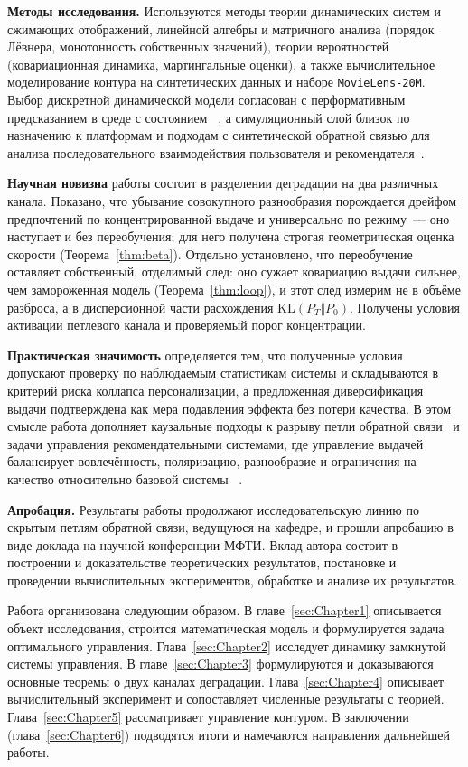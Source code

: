 \textbf{Методы исследования.} Используются методы теории динамических систем и
сжимающих отображений, линейной алгебры и матричного анализа (порядок Лёвнера,
монотонность собственных значений), теории вероятностей (ковариационная
динамика, мартингальные оценки), а также вычислительное моделирование контура на
синтетических данных и наборе \texttt{MovieLens-20M}. Выбор дискретной
динамической модели согласован с перформативным предсказанием в среде с состоянием
~\cite{brown2022stateful}, а симуляционный слой близок по назначению к
платформам и подходам с синтетической обратной связью для анализа последовательного
взаимодействия пользователя и рекомендателя~\cite{ie2019,
wang2021generativeFeedback}.

\textbf{Научная новизна} работы состоит в разделении деградации на два различных
канала. Показано, что убывание совокупного разнообразия порождается дрейфом
предпочтений по концентрированной выдаче и универсально по режиму~--- оно
наступает и без переобучения; для него получена строгая геометрическая оценка
скорости (Теорема~\ref{thm:beta}). Отдельно установлено, что переобучение
оставляет собственный, отделимый след: оно сужает ковариацию выдачи сильнее, чем
замороженная модель (Теорема~\ref{thm:loop}), и этот след измерим не в объёме
разброса, а в дисперсионной части расхождения $\mathrm{KL}(P_T\Vert P_0)$.
Получены условия активации петлевого канала и проверяемый порог концентрации.

\textbf{Практическая значимость} определяется тем, что полученные условия
допускают проверку по наблюдаемым статистикам системы и складываются в критерий
риска коллапса персонализации, а предложенная диверсификация выдачи подтверждена
как мера подавления эффекта без потери качества. В этом смысле работа дополняет
каузальные подходы к разрыву петли обратной связи~\cite{krauth2022} и
задачи управления рекомендательными системами, где управление выдачей балансирует
вовлечённость, поляризацию, разнообразие и ограничения на качество относительно базовой системы
~\cite{chandrasekaran2026networkAware, chow2014baselineControl}.

\textbf{Апробация.} Результаты работы продолжают исследовательскую линию по
скрытым петлям обратной связи, ведущуюся на кафедре, и прошли апробацию в виде
доклада на научной конференции МФТИ. Вклад автора состоит в построении и
доказательстве теоретических результатов, постановке и проведении вычислительных
экспериментов, обработке и анализе их результатов.

Работа организована следующим образом. В главе~\ref{sec:Chapter1}
описывается объект исследования, строится математическая модель и формулируется
задача оптимального управления. Глава~\ref{sec:Chapter2} исследует динамику
замкнутой системы управления. В главе~\ref{sec:Chapter3} формулируются и доказываются основные
теоремы о двух каналах деградации. Глава~\ref{sec:Chapter4} описывает
вычислительный эксперимент и сопоставляет численные результаты с теорией.
Глава~\ref{sec:Chapter5} рассматривает управление контуром. В заключении
(глава~\ref{sec:Chapter6}) подводятся итоги и намечаются направления дальнейшей
работы.
